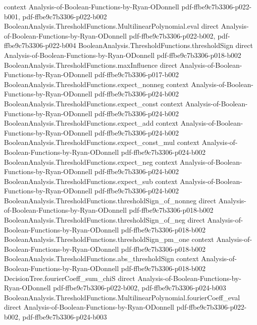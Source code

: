 \begin{theorem}
  {context}
  {Analysis-of-Boolean-Functions-by-Ryan-ODonnell}
  {pdf-ffbe9c7b3306-p022-b001,
    pdf-ffbe9c7b3306-p022-b002}
\proofstep
  {BooleanAnalysis.ThresholdFunctions.MultilinearPolynomial.eval}
  {direct}
  {Analysis-of-Boolean-Functions-by-Ryan-ODonnell}
  {pdf-ffbe9c7b3306-p022-b002,
    pdf-ffbe9c7b3306-p022-b004}
\proofstep
  {BooleanAnalysis.ThresholdFunctions.thresholdSign}
  {direct}
  {Analysis-of-Boolean-Functions-by-Ryan-ODonnell}
  {pdf-ffbe9c7b3306-p018-b002}
\proofstep
  {BooleanAnalysis.ThresholdFunctions.maxInfluence}
  {direct}
  {Analysis-of-Boolean-Functions-by-Ryan-ODonnell}
  {pdf-ffbe9c7b3306-p017-b002}
\proofstep
  {BooleanAnalysis.ThresholdFunctions.expect_nonneg}
  {context}
  {Analysis-of-Boolean-Functions-by-Ryan-ODonnell}
  {pdf-ffbe9c7b3306-p024-b002}
\proofstep
  {BooleanAnalysis.ThresholdFunctions.expect_const}
  {context}
  {Analysis-of-Boolean-Functions-by-Ryan-ODonnell}
  {pdf-ffbe9c7b3306-p024-b002}
\proofstep
  {BooleanAnalysis.ThresholdFunctions.expect_add}
  {context}
  {Analysis-of-Boolean-Functions-by-Ryan-ODonnell}
  {pdf-ffbe9c7b3306-p024-b002}
\proofstep
  {BooleanAnalysis.ThresholdFunctions.expect_const_mul}
  {context}
  {Analysis-of-Boolean-Functions-by-Ryan-ODonnell}
  {pdf-ffbe9c7b3306-p024-b002}
\proofstep
  {BooleanAnalysis.ThresholdFunctions.expect_neg}
  {context}
  {Analysis-of-Boolean-Functions-by-Ryan-ODonnell}
  {pdf-ffbe9c7b3306-p024-b002}
\proofstep
  {BooleanAnalysis.ThresholdFunctions.expect_sub}
  {context}
  {Analysis-of-Boolean-Functions-by-Ryan-ODonnell}
  {pdf-ffbe9c7b3306-p024-b002}
\proofstep
  {BooleanAnalysis.ThresholdFunctions.thresholdSign_of_nonneg}
  {direct}
  {Analysis-of-Boolean-Functions-by-Ryan-ODonnell}
  {pdf-ffbe9c7b3306-p018-b002}
\proofstep
  {BooleanAnalysis.ThresholdFunctions.thresholdSign_of_neg}
  {direct}
  {Analysis-of-Boolean-Functions-by-Ryan-ODonnell}
  {pdf-ffbe9c7b3306-p018-b002}
\proofstep
  {BooleanAnalysis.ThresholdFunctions.thresholdSign_pm_one}
  {context}
  {Analysis-of-Boolean-Functions-by-Ryan-ODonnell}
  {pdf-ffbe9c7b3306-p018-b002}
\proofstep
  {BooleanAnalysis.ThresholdFunctions.abs_thresholdSign}
  {context}
  {Analysis-of-Boolean-Functions-by-Ryan-ODonnell}
  {pdf-ffbe9c7b3306-p018-b002}
\proofstep
  {DecisionTree.fourierCoeff_sum_chiS}
  {direct}
  {Analysis-of-Boolean-Functions-by-Ryan-ODonnell}
  {pdf-ffbe9c7b3306-p022-b002,
    pdf-ffbe9c7b3306-p024-b003}
\proofstep
  {BooleanAnalysis.ThresholdFunctions.MultilinearPolynomial.fourierCoeff_eval}
  {direct}
  {Analysis-of-Boolean-Functions-by-Ryan-ODonnell}
  {pdf-ffbe9c7b3306-p022-b002,
    pdf-ffbe9c7b3306-p024-b003}

\end{theorem}
